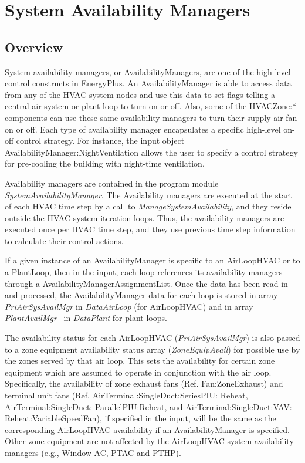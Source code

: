 \section{System Availability Managers }\label{system-availability-managers}

\subsection{Overview}\label{overview-025}

System availability managers, or AvailabilityManagers, are one of the high-level control constructs in EnergyPlus. An AvailabilityManager is able to access data from any of the HVAC system nodes and use this data to set flags telling a central air system or plant loop to turn on or off. Also, some of the HVACZone:* components can use these same availability managers to turn their supply air fan on or off. Each type of availability manager encapsulates a specific high-level on-off control strategy. For instance, the input object AvailabilityManager:NightVentilation allows the user to specify a control strategy for pre-cooling the building with night-time ventilation.

Availability managers are contained in the program module \emph{SystemAvailabilityManager}. The Availability managers are executed at the start of each HVAC time step by a call to \emph{ManageSystemAvailability}, and they reside outside the HVAC system iteration loops. Thus, the availability managers are executed once per HVAC time step, and they use previous time step information to calculate their control actions.

If a given instance of an AvailabilityManager is specific to an AirLoopHVAC or to a PlantLoop, then in the input, each loop references its availability managers through a AvailabilityManagerAssignmentList. Once the data has been read in and processed, the AvailabilityManager data for each loop is stored in array \emph{PriAirSysAvailMgr} in \emph{DataAirLoop} (for AirLoopHVAC) and in array \emph{PlantAvailMgr} ~in \emph{DataPlant} for plant loops.

The availability status for each AirLoopHVAC (\emph{PriAirSysAvailMgr}) is also passed to a zone equipment availability status array (\emph{ZoneEquipAvail}) for possible use by the zones served by that air loop. This sets the availability for certain zone equipment which are assumed to operate in conjunction with the air loop. Specifically, the availability of zone exhaust fans (Ref. Fan:ZoneExhaust) and terminal unit fans (Ref. AirTerminal:SingleDuct:SeriesPIU: Reheat, AirTerminal:SingleDuct: ParallelPIU:Reheat, and AirTerminal:SingleDuct:VAV: Reheat:VariableSpeedFan), if specified in the input, will be the same as the corresponding AirLoopHVAC availability if an AvailabilityManager is specified. Other zone equipment are not affected by the AirLoopHVAC system availability managers (e.g., Window AC, PTAC and PTHP).

